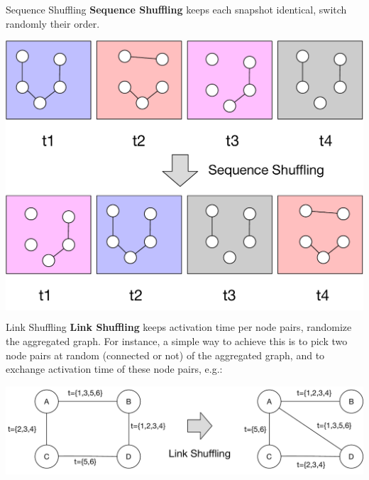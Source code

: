 \documentclass[a4paper,11pt]{book}
\begin{document}
\begin{textbox}{Sequence Shuffling}
 \textbf{Sequence Shuffling} keeps each snapshot identical, switch randomly their order. 
 
 
 
\centering
\colorbox{white}{\includegraphics[width=0.8\linewidth]{pics/dynamic/squence_shuffling.pdf}}
 
\end{textbox}





\begin{textbox}{Link Shuffling}
 \textbf{Link Shuffling} keeps activation time per node pairs, randomize the aggregated graph. For instance, a simple way to achieve this is to pick two node pairs at random (connected or not) of the aggregated graph, and to exchange activation time of these node pairs, e.g.:
   

 
 
\centering
\colorbox{white}{\includegraphics[width=0.9\linewidth]{pics/dynamic/link-shuffling.pdf}}
 
\end{textbox}
\end{document}
